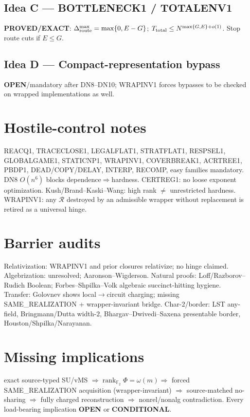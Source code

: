 \documentclass[11pt]{article}
\begin{document}
\subsection*{Idea C --- BOTTLENECK1 / TOTALENV1}
\textbf{PROVED/EXACT}: $\Delta_{\rm route}^{\max}=\max\{0,E-G\}$;
$T_{\rm total}\le N^{\max\{G,E\}+o(1)}$. Stop route cuts if $E\le G$.

\subsection*{Idea D --- Compact-representation bypass}
\textbf{OPEN}/mandatory after DN8--DN10; WRAPINV1 forces bypasses to be checked on wrapped
implementations as well.

\section*{Hostile-control notes}
REACQ1, TRACECLOSE1, LEGALFLAT1, STRATFLAT1, RESPSEL1, GLOBALGAME1, STATICNP1, WRAPINV1,
COVERBREAK1, ACRTREE1, PBDP1, DEAD/COPY/DELAY, INTERP, RECOMP, easy families mandatory.
DN8 $O(n^6)$ blocks dependence$\Rightarrow$hardness. CERTREG1: no loose exponent optimization.
Kush/Brand--Kaski--Wang: high rank $\neq$ unrestricted hardness.
WRAPINV1: any $\mathcal R$ destroyed by an admissible wrapper without replacement is retired
as a universal hinge.

\section*{Barrier audits}
Relativization: WRAPINV1 and prior closures relativize; no hinge claimed. Algebrization:
unresolved; Aaronson--Wigderson. Natural proofs: Loff/Razborov--Rudich Boolean; Forbes--Shpilka--Volk
algebraic succinct-hitting hygiene. Transfer: Golovnev shows local$\to$circuit charging; missing
SAME\_REALIZATION + wrapper-invariant bridge. Char-$2$/border: LST any-field, Bringmann/Dutta
width-$2$, Bhargav--Dwivedi--Saxena presentable border, Houston/Shpilka/Narayanan.

\section*{Missing implications}
exact source-typed SU/vMS $\Rightarrow\operatorname{rank}_{\mathbb F_2}\Phi=\omega(m)
\Rightarrow$ forced SAME\_REALIZATION acquisition (wrapper-invariant)
$\Rightarrow$ source-matched no-sharing $\Rightarrow$ fully charged reconstruction
$\Rightarrow$ nonrel/nonalg contradiction.
Every load-bearing implication \textbf{OPEN} or \textbf{CONDITIONAL}.
\end{document}
